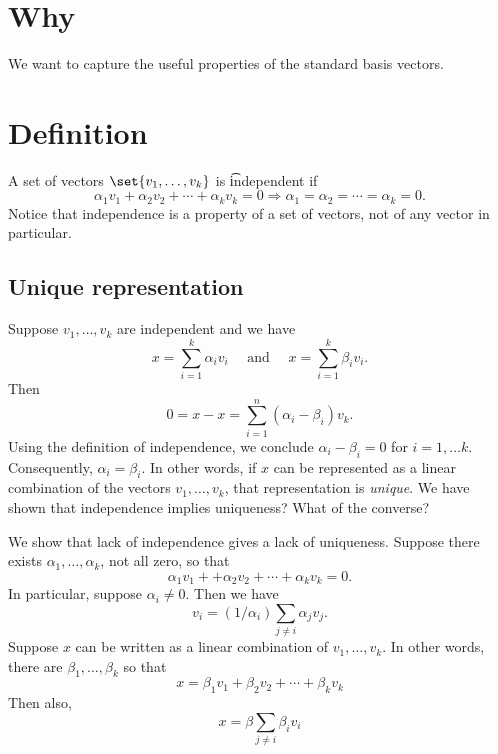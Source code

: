 
\section*{Why}

We want to capture the useful properties of the standard basis vectors.

\section*{Definition}

A set of vectors $\set{v_1, \dots , v_k}$ is \t{independent} if
  \[
\alpha _1v_1 + \alpha _2v_2 + \cdots + \alpha _kv_k = 0 \Rightarrow \alpha _1 = \alpha _2 = \cdots = \alpha _k = 0.
  \]
Notice that independence is a property of a set of vectors, not of any vector in particular.

\subsection*{Unique representation}

Suppose $v_1, \dots , v_k$ are independent and we have
  \[
x = \sum_{i = 1}^{k}\alpha _i v_i \quad \text{ and } \quad x = \sum_{i = 1}^{k} \beta _i v_i.
  \]
Then
  \[
0 = x - x = \sum_{i = 1}^{n} (\alpha _i - \beta _i)v_k.
  \]
Using the definition of independence, we conclude $\alpha _i - \beta _i = 0$ for $i = 1, \dots  k$.
Consequently, $\alpha _i = \beta _i$.
In other words, if $x$ can be represented as a linear combination of the vectors $v_1, \dots , v_k$, that representation is \textit{unique}.
We have shown that independence implies uniqueness?
What of the converse?

We show that lack of independence gives a lack of uniqueness.
Suppose there exists $\alpha _1, \dots , \alpha _k$, not all zero, so that
  \[
\alpha _1v_1 + + \alpha _2 v_2 + \cdots + \alpha _kv_k = 0.
  \]
In particular, suppose $\alpha _i \neq 0$.
Then we have
  \[
v_i = (1/\alpha _i) \sum_{j \neq i}\alpha _j v_j.
  \]
Suppose $x$ can be written as a linear combination of $v_1, \dots , v_k$.
In other words, there are $\beta _1, \dots , \beta _k$ so that
  \[
x = \beta _1 v_1 + \beta _2 v_2 + \cdots + \beta _k v_k
  \]
Then also,
  \[
x = \beta  \sum_{j \neq i}\beta _i v_i
  \]

\blankpage
